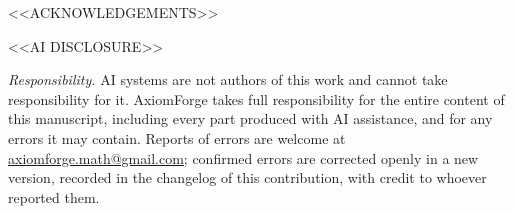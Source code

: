 
<<ACKNOWLEDGEMENTS>>



<<AI DISCLOSURE>>

\emph{Responsibility.} AI systems are not authors of this work and cannot take responsibility
for it. AxiomForge takes full responsibility for the entire content of this manuscript,
including every part produced with AI assistance, and for any errors it may contain. Reports
of errors are welcome at \href{mailto:axiomforge.math@gmail.com}{axiomforge.math@gmail.com};
confirmed errors are corrected openly in a new version, recorded in the changelog of this
contribution, with credit to whoever reported them.

